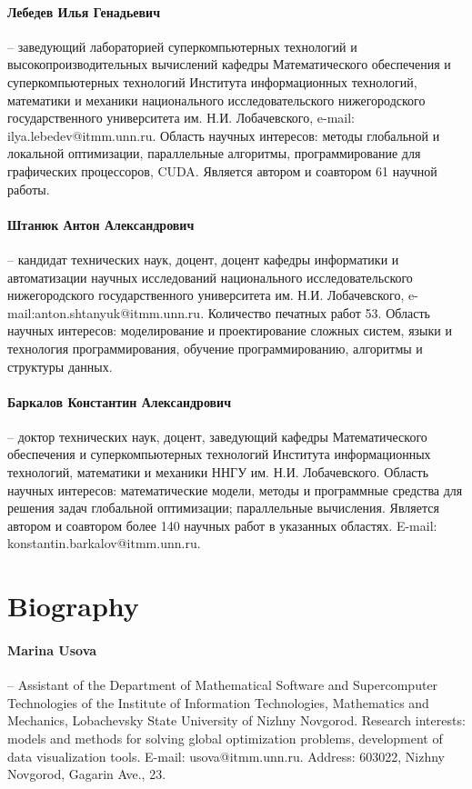 \documentclass[a4paper,12pt,russian]{article}
\begin{document}
\paragraph{Лебедев Илья Генадьевич} -- заведующий лабораторией суперкомпьютерных технологий и высокопроизводительных вычислений кафедры Математического обеспечения и суперкомпьютерных технологий Института информационных технологий, математики и механики национального исследовательского нижегородского государственного университета им. Н.И. Лобачевского, e-mail: ilya.lebedev@itmm.unn.ru. Область научных интересов: методы глобальной и локальной оптимизации, параллельные алгоритмы, программирование для графических процессоров, CUDA. Является автором и соавтором 61 научной работы.
\paragraph{Штанюк Антон Александрович} -- кандидат технических наук, доцент, доцент кафедры информатики и автоматизации научных исследований национального исследовательского нижегородского государственного университета им. Н.И. Лобачевского, e-mail:anton.shtanyuk@itmm.unn.ru. Количество печатных работ 53. Область научных интересов: моделирование и проектирование сложных систем, языки и технология программирования, обучение программированию, алгоритмы и структуры данных.
\paragraph{Баркалов Константин Александрович} -- 
доктор технических наук, доцент, заведующий кафедры Математического обеспечения и суперкомпьютерных технологий Института информационных технологий, математики и механики ННГУ им. Н.И. Лобачевского. Область научных интересов: математические модели, методы и программные средства для решения задач глобальной оптимизации; параллельные вычисления. Является автором и соавтором более 140 научных работ в указанных областях. E-mail: konstantin.barkalov@itmm.unn.ru. 

\section*{Biography}

\paragraph{Marina Usova} -- Assistant of the Department of Mathematical Software and Supercomputer Technologies of the Institute of Information Technologies, Mathematics and Mechanics, Lobachevsky State University of Nizhny Novgorod. Research interests: models and methods for solving global optimization problems, development of data visualization tools. E-mail: usova@itmm.unn.ru. Address: 603022, Nizhny Novgorod, Gagarin Ave., 23.
\end{document}
